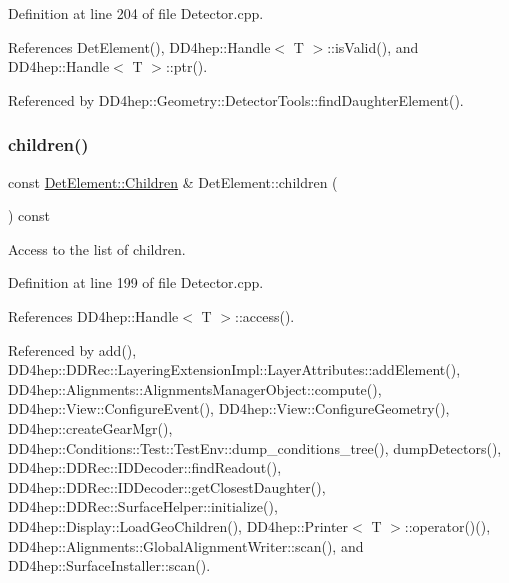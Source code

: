 Definition at line 204 of file Detector.\+cpp.



References Det\+Element(), D\+D4hep\+::\+Handle$<$ T $>$\+::is\+Valid(), and D\+D4hep\+::\+Handle$<$ T $>$\+::ptr().



Referenced by D\+D4hep\+::\+Geometry\+::\+Detector\+Tools\+::find\+Daughter\+Element().

\hypertarget{class_d_d4hep_1_1_geometry_1_1_det_element_ab32f6441336990dc9a44cb4420b01644}{}\label{class_d_d4hep_1_1_geometry_1_1_det_element_ab32f6441336990dc9a44cb4420b01644} 
\subsubsection{\texorpdfstring{children()}{children()}}
{\footnotesize\ttfamily const \hyperlink{class_d_d4hep_1_1_geometry_1_1_det_element_afc41f63ac2a467f5077d1cca1292d580}{Det\+Element\+::\+Children} \& Det\+Element\+::children (\begin{DoxyParamCaption}{ }\end{DoxyParamCaption}) const}



Access to the list of children. 



Definition at line 199 of file Detector.\+cpp.



References D\+D4hep\+::\+Handle$<$ T $>$\+::access().



Referenced by add(), D\+D4hep\+::\+D\+D\+Rec\+::\+Layering\+Extension\+Impl\+::\+Layer\+Attributes\+::add\+Element(), D\+D4hep\+::\+Alignments\+::\+Alignments\+Manager\+Object\+::compute(), D\+D4hep\+::\+View\+::\+Configure\+Event(), D\+D4hep\+::\+View\+::\+Configure\+Geometry(), D\+D4hep\+::create\+Gear\+Mgr(), D\+D4hep\+::\+Conditions\+::\+Test\+::\+Test\+Env\+::dump\+\_\+conditions\+\_\+tree(), dump\+Detectors(), D\+D4hep\+::\+D\+D\+Rec\+::\+I\+D\+Decoder\+::find\+Readout(), D\+D4hep\+::\+D\+D\+Rec\+::\+I\+D\+Decoder\+::get\+Closest\+Daughter(), D\+D4hep\+::\+D\+D\+Rec\+::\+Surface\+Helper\+::initialize(), D\+D4hep\+::\+Display\+::\+Load\+Geo\+Children(), D\+D4hep\+::\+Printer$<$ T $>$\+::operator()(), D\+D4hep\+::\+Alignments\+::\+Global\+Alignment\+Writer\+::scan(), and D\+D4hep\+::\+Surface\+Installer\+::scan().

